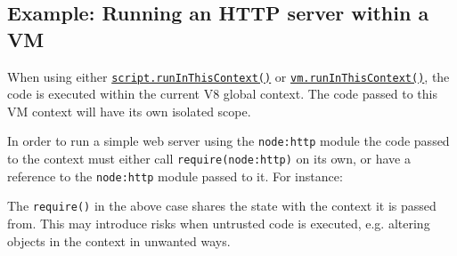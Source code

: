 \subsection{Example: Running an HTTP server within a
VM}\label{example-running-an-http-server-within-a-vm}

When using either
\hyperref[scriptruninthiscontextoptions]{\texttt{script.runInThisContext()}}
or
\hyperref[vmruninthiscontextcode-options]{\texttt{vm.runInThisContext()}},
the code is executed within the current V8 global context. The code
passed to this VM context will have its own isolated scope.

In order to run a simple web server using the \texttt{node:http} module
the code passed to the context must either call
\texttt{require(\textquotesingle{}node:http\textquotesingle{})} on its
own, or have a reference to the \texttt{node:http} module passed to it.
For instance:

\begin{Shaded}
\begin{Highlighting}[]
\OperatorTok{;}
\OperatorTok{=} \NormalTok{(}\NormalTok{)}\OperatorTok{;}

\OperatorTok{=} \VerbatimStringTok{\textasciigrave{}}

\SpecialCharTok{\textbackslash{}\textbackslash{}}

\VerbatimStringTok{\})\textasciigrave{}}\OperatorTok{;}

\OperatorTok{;}
\end{Highlighting}
\end{Shaded}

The \texttt{require()} in the above case shares the state with the
context it is passed from. This may introduce risks when untrusted code
is executed, e.g. altering objects in the context in unwanted ways.

